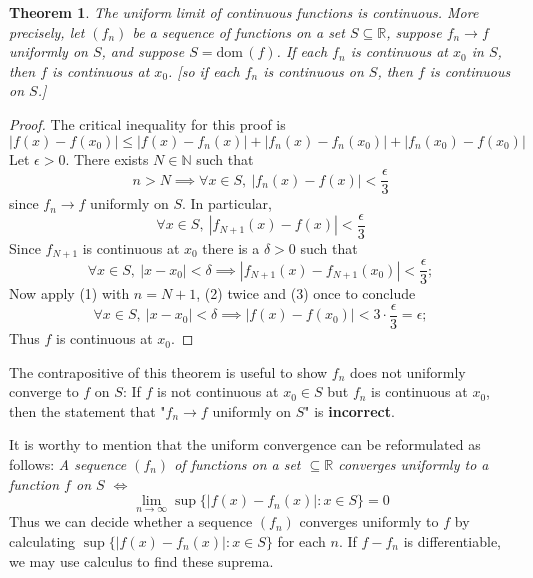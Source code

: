 \documentclass[12pt, lettersize]{book}
\theoremstyle{plain}
\newtheorem{thm}{Theorem}[section]
\theoremstyle{definition}
\theoremstyle{remark}
\newcommand{\R}{\mathbb{R}}
\newcommand{\N}{\mathbb{N}}
\newcommand{\dom}{\text{dom}\,}
\begin{document}
			\setcounter{equation}{0}
			\begin{thm}\label{thm:24.3}
			The uniform limit of continuous functions is continuous. More precisely, let $(f_n)$ be a sequence of functions
			on a set $S\subseteq\R$, suppose $f_n\rightarrow f$ uniformly on $S$, and suppose $S=\dom(f)$. If each $f_n$ is
			continuous at $x_0$ in $S$, then $f$ is continuous at $x_0$. [so if each $f_n$ is continuous on $S$, then $f$ is continuous on $S$.]
			\end{thm}
			\begin{proof}
			The critical inequality for this proof is
			\begin{equation}
				|f(x)-f(x_0)|\leq|f(x)-f_n(x)|+|f_n(x)-f_n(x_0)|+|f_n(x_0)-f(x_0)|
			\end{equation}
			Let $\epsilon>0$. There exists $N\in\N$ such that
			\begin{displaymath}
				n>N\implies \forall x\in S,\ |f_n(x)-f(x)|<\frac{\epsilon}{3}
			\end{displaymath}
			since $f_n\rightarrow f$ uniformly on $S$. In particular,
			\begin{equation}
				\forall x\in S,\ |f_{N+1}(x)-f(x)|<\frac{\epsilon}{3}
			\end{equation}
			Since $f_{N+1}$ is continuous at $x_0$ there is a $\delta>0$ such that
			\begin{equation}
				\forall x\in S,\ |x-x_0|<\delta\implies|f_{N+1}(x)-f_{N+1}(x_0)|<\frac{\epsilon}{3};
			\end{equation}
			Now apply (1) with $n=N+1$, (2) twice and (3) once to conclude
			\begin{displaymath}
				\forall x\in S,\ |x-x_0|<\delta\implies|f(x)-f(x_0)|<3\cdot\frac{\epsilon}{3}=\epsilon;
			\end{displaymath}
		 	Thus $f$ is continuous at $x_0$.
			\end{proof}
			The contrapositive of this theorem is useful to show $f_n$ does not uniformly converge to $f$ on $S$:
			If $f$ is not continuous at $x_0\in S$ but $f_n$ is continuous at $x_0$, then the statement that "$f_n\rightarrow f$ uniformly on $S$" is \textbf{incorrect}.
		
			It is worthy to mention that the uniform convergence can be reformulated as follows: \emph{A sequence $(f_n)$ of functions on a set $\subseteq\R$ converges uniformly to a function $f$ on $S$ $\iff$}
			\begin{displaymath}
				\lim\limits_{n\rightarrow\infty}\sup\{|f(x)-f_n(x)|: x\in S\}=0
			\end{displaymath}
			Thus we can decide whether a sequence $(f_n)$ converges uniformly to $f$ by calculating $\sup\{|f(x)-f_n(x)|: x\in S\}$ for each $n$. If $f-f_n$ is differentiable, we may use calculus to find these suprema.
			\newpage
\end{document}
